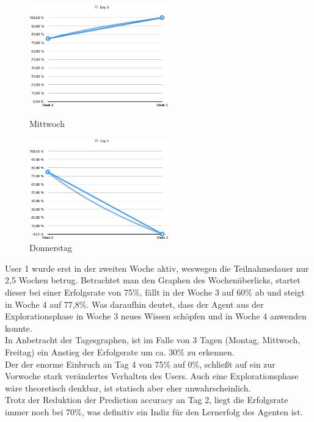 \begin{figure}[t!]
    \centering
    \parbox{6cm}{
    \includegraphics[width=6cm]{./Abbildungen/Kapitel_04/usr1day3.png}
    \caption{Mittwoch}
    \label{usr1day3}}
    \qquad
    \begin{minipage}{6cm}
    \includegraphics[width=6cm]{./Abbildungen/Kapitel_04/usr1day4.png}
    \caption{Donnerstag}
    \label{usr1day4}
    \end{minipage}
\end{figure}

User 1 wurde erst in der zweiten Woche aktiv, weswegen die Teilnahmedauer nur 2,5 Wochen betrug. 
Betrachtet man den Graphen des Wochenüberlicks, startet dieser bei einer Erfolgsrate von 75\%, fällt in der Woche 3 auf 60\% ab und steigt in Woche 4 auf 77,8\%. Was daraufhin deutet, dass der Agent aus der Explorationsphase in Woche 3 neues Wissen schöpfen und in Woche 4 anwenden konnte.\\
In Anbetracht der Tagesgraphen, ist im Falle von 3 Tagen (Montag, Mittwoch, Freitag) ein Anstieg der Erfolgsrate um ca. 30\% zu erkennen. \\
Der der enorme Einbruch an Tag 4 von 75\% auf 0\%, schließt auf ein zur Vorwoche stark verändertes Verhalten des Users. Auch eine Explorationsphase wäre theoretisch denkbar, ist statisch aber eher unwahrscheinlich.\\
Trotz der Reduktion der Prediction accuracy an Tag 2, liegt die Erfolgsrate immer noch bei 70\%, was definitiv ein Indiz für den Lernerfolg des Agenten ist. 



